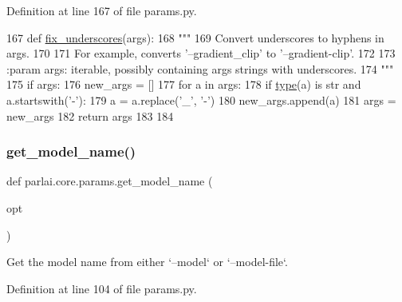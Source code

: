 Definition at line 167 of file params.\+py.


\begin{DoxyCode}
167 \textcolor{keyword}{def }\hyperlink{namespaceparlai_1_1core_1_1params_afe2837a1dc21017be30cc7e3cb3696b8}{fix\_underscores}(args):
168     \textcolor{stringliteral}{"""}
169 \textcolor{stringliteral}{    Convert underscores to hyphens in args.}
170 \textcolor{stringliteral}{}
171 \textcolor{stringliteral}{    For example, converts '--gradient\_clip' to '--gradient-clip'.}
172 \textcolor{stringliteral}{}
173 \textcolor{stringliteral}{    :param args: iterable, possibly containing args strings with underscores.}
174 \textcolor{stringliteral}{    """}
175     \textcolor{keywordflow}{if} args:
176         new\_args = []
177         \textcolor{keywordflow}{for} a \textcolor{keywordflow}{in} args:
178             \textcolor{keywordflow}{if} \hyperlink{namespaceparlai_1_1agents_1_1tfidf__retriever_1_1build__tfidf_ad5dfae268e23f506da084a9efb72f619}{type}(a) \textcolor{keywordflow}{is} str \textcolor{keywordflow}{and} a.startswith(\textcolor{stringliteral}{'-'}):
179                 a = a.replace(\textcolor{stringliteral}{'\_'}, \textcolor{stringliteral}{'-'})
180             new\_args.append(a)
181         args = new\_args
182     \textcolor{keywordflow}{return} args
183 
184 
\end{DoxyCode}
\mbox{\label{namespaceparlai_1_1core_1_1params_a6d160324f6af84562334fd0698141074}} 
\subsubsection{\texorpdfstring{get\+\_\+model\+\_\+name()}{get\_model\_name()}}
{\footnotesize\ttfamily def parlai.\+core.\+params.\+get\+\_\+model\+\_\+name (\begin{DoxyParamCaption}\item[{}]{opt }\end{DoxyParamCaption})}

\begin{DoxyVerb}Get the model name from either `--model` or `--model-file`.
\end{DoxyVerb}
 

Definition at line 104 of file params.\+py.


